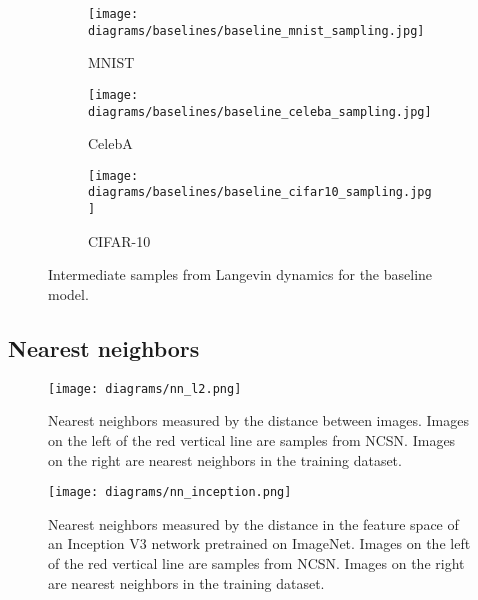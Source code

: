 \documentclass{article}
\begin{document}
\begin{figure}[H]
    \centering
    \begin{subfigure}[b]{0.3\textwidth}
        \texttt{[image: diagrams/baselines/baseline\_mnist\_sampling.jpg]}
        \caption{MNIST}
        \label{fig:baseline_mnist_p}
    \end{subfigure}
    \begin{subfigure}[b]{0.3\textwidth}
        \texttt{[image: diagrams/baselines/baseline\_celeba\_sampling.jpg]}
        \caption{CelebA}
        \label{fig:baseline_celeba_p}
    \end{subfigure}
    \begin{subfigure}[b]{0.3\textwidth}
        \texttt{[image: diagrams/baselines/baseline\_cifar10\_sampling.jpg]}
        \caption{CIFAR-10}
        \label{fig:baseline_cifar10_p}
    \end{subfigure}
    \caption{Intermediate samples from Langevin dynamics for the baseline model.}
    \label{fig:baseline_samples_procedure}
\end{figure}
\FloatBarrier
\vfill
\newpage
\subsection{Nearest neighbors}\label{app:nn}
\vspace*{\fill}
\FloatBarrier
\begin{figure}[H]
    \centering
    \texttt{[image: diagrams/nn\_l2.png]}
    \caption{Nearest neighbors measured by the  distance between images. Images on the left of the red vertical line are samples from NCSN. Images on the right are nearest neighbors in the training dataset.}
\end{figure}
\begin{figure}[H]
    \centering
    \texttt{[image: diagrams/nn\_inception.png]}
    \caption{Nearest neighbors measured by the  distance in the feature space of an Inception V3 network pretrained on ImageNet. Images on the left of the red vertical line are samples from NCSN. Images on the right are nearest neighbors in the training dataset.}
\end{figure}
\FloatBarrier
\vfill
\newpage
\end{document}
